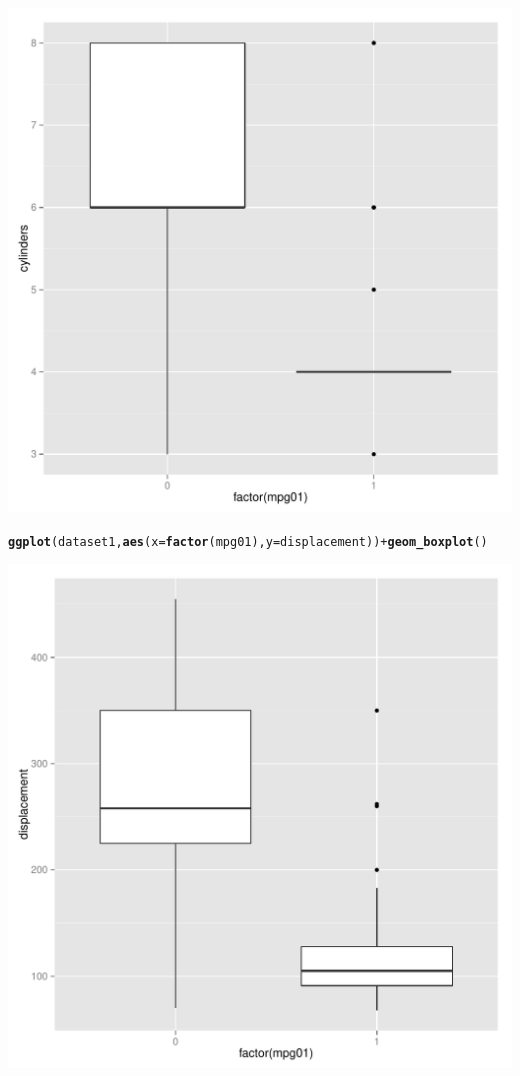 \documentclass{article}\usepackage[]{graphicx}\usepackage[]{color}
\makeatletter
\def\maxwidth{ %
  \ifdim\Gin@nat@width>\linewidth
    \linewidth
  \else
    \Gin@nat@width
  \fi
}
\newcommand{\hlopt}[1]{\textcolor[rgb]{0,0,0}{#1}}%
\newcommand{\hlstd}[1]{\textcolor[rgb]{0.345,0.345,0.345}{#1}}%
\newcommand{\hlkwc}[1]{\textcolor[rgb]{0.333,0.667,0.333}{#1}}%
\newcommand{\hlkwd}[1]{\textcolor[rgb]{0.737,0.353,0.396}{\textbf{#1}}}%
\newenvironment{kframe}{%
 \def\at@end@of@kframe{}%
 \ifinner\ifhmode%
  \def\at@end@of@kframe{\end{minipage}}%
  \begin{minipage}{\columnwidth}%
 \fi\fi%
 \def\FrameCommand##1{\hskip\@totalleftmargin \hskip-\fboxsep
 \colorbox{shadecolor}{##1}\hskip-\fboxsep
     \hskip-\linewidth \hskip-\@totalleftmargin \hskip\columnwidth}%
 \MakeFramed {\advance\hsize-\width
   \@totalleftmargin\z@ \linewidth\hsize
   \@setminipage}}%
 {\par\unskip\endMakeFramed%
 \at@end@of@kframe}
\newenvironment{knitrout}{}{} %
\makeatother
\begin{document}
\begin{enumerate}[(a)]
\begin{knitrout}
\includegraphics[width=\maxwidth]{figure/unnamed-chunk-7-3} 
\begin{kframe}\begin{alltt}
\hlkwd{ggplot}\hlstd{(dataset1,} \hlkwd{aes}\hlstd{(}\hlkwc{x}\hlstd{=}\hlkwd{factor}\hlstd{(mpg01),} \hlkwc{y}\hlstd{=displacement))}\hlopt{+}\hlkwd{geom_boxplot}\hlstd{()}
\end{alltt}
\end{kframe}
\includegraphics[width=\maxwidth]{figure/unnamed-chunk-7-4} 

\end{knitrout}
\end{enumerate}
\end{document}
